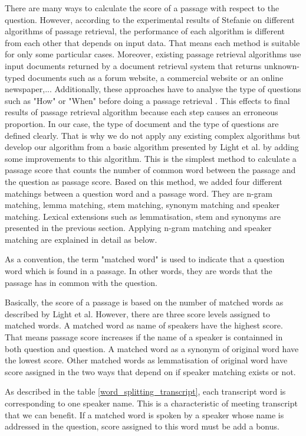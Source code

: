 \documentclass[10pt,a4paper]{article}
\numberwithin{algorithm}{section}  %
\begin{document}
There are many ways to calculate the score of a passage with respect to the question. However, according to the experimental results of Stefanie \cite{tellex2003qep} on different algorithms of passage retrieval, the performance of each algorithm is different from each other that depends on input data. That means each method is suitable for only some particular cases. Moreover, existing passage retrieval algorithms use input documents returned by a document retrieval system that returns unknown-typed documents such as a forum website, a commercial website or an online newspaper,... Additionally, these approaches have to analyse the type of questions such as "How" or "When" before doing a passage retrieval  \cite{TREC8, TREC2001, hirschman2002nlq, tellex2003qep}. This effects to final results of passage retrieval algorithm because each step causes an erroneous proportion. In our case, the type of document and the type of questions are defined clearly. That is why we do not apply any existing complex algorithms but develop our algorithm from a basic algorithm presented by Light et al. \cite{light2002aec} by adding some improvements to this algorithm. This is the simplest method to calculate a passage score that counts the number of common word between the passage and the question as passage score. Based on this method, we added four different matchings between a question word and a passage word. They are n-gram matching, lemma matching, stem matching, synonym matching and speaker matching. Lexical extensions such as lemmatisation, stem and synonyms are presented in the previous section. Applying n-gram matching and speaker matching are explained in detail as below.

As a convention, the term "matched word" is used to indicate that a question word which is found in a passage. In other words, they are words that the passage has in common with the question.


Basically, the score of a passage is based on the number of matched words as described by Light et al. However, there are three score levels assigned to matched words. A matched word as name of speakers have the highest score. That means passage score increases if the name of a speaker is containned in both question and question. A matched word as a synonym of original word have the lowest score. Other matched words as lemmatisation of original word have score assigned in the two ways that depend on if speaker matching exists or not.

As described in the table \ref{word_splitting_transcript}, each transcript word is corresponding to one speaker name. This is a characteristic of meeting transcript that we can benefit. If a matched word is spoken by a speaker whose name is addressed in the question, score assigned to this word must be add a bonus. 
\end{document}
